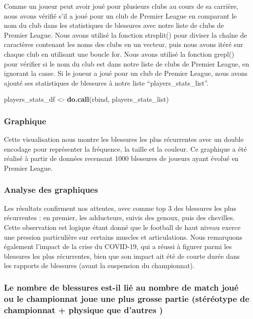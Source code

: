 \documentclass[
]{article}
\newenvironment{Shaded}{\begin{snugshade}}{\end{snugshade}}
\newcommand{\FunctionTok}[1]{\textcolor[rgb]{0.13,0.29,0.53}{\textbf{#1}}}
\newcommand{\NormalTok}[1]{#1}
\newcommand{\OtherTok}[1]{\textcolor[rgb]{0.56,0.35,0.01}{#1}}
\begin{document}
Comme un joueur peut avoir joué pour plusieurs clubs au cours de sa
carrière, nous avons vérifié s'il a joué pour un club de Premier League
en comparant le nom du club dans les statistiques de blessures avec
notre liste de clubs de Premier League. Nous avons utilisé la fonction
strsplit() pour diviser la chaîne de caractères contenant les noms des
clubs en un vecteur, puis nous avons itéré sur chaque club en utilisant
une boucle for. Nous avons utilisé la fonction grepl() pour vérifier si
le nom du club est dans notre liste de clubs de Premier League, en
ignorant la casse. Si le joueur a joué pour un club de Premier League,
nous avons ajouté ses statistiques de blessures à notre liste
``players\_stats\_list''.

\begin{Shaded}
\begin{Highlighting}[]
\NormalTok{players\_stats\_df }\OtherTok{\textless{}{-}} \FunctionTok{do.call}\NormalTok{(rbind, players\_stats\_list)}
\end{Highlighting}
\end{Shaded}

\subsubsection{Graphique}\label{graphique-1}

Cette visualisation nous montre les blessures les plus récurrentes avec
un double encodage pour représenter la fréquence, la taille et la
couleur. Ce graphique a été réalisé à partir de données recensant 1000
blessures de joueurs ayant évolué en Premier League.

\subsubsection{Analyse des graphiques}\label{analyse-des-graphiques}

Les résultats confirment nos attentes, avec comme top 3 des blessures
les plus récurrentes : en premier, les adducteurs, suivis des genoux,
puis des chevilles. Cette observation est logique étant donné que le
football de haut niveau exerce une pression particulière sur certains
muscles et articulations. Nous remarquons également l'impact de la crise
du COVID-19, qui a réussi à figurer parmi les blessures les plus
récurrentes, bien que son impact ait été de courte durée dans les
rapports de blessures (avant la suspension du championnat).

\subsubsection{\texorpdfstring{\textbf{Le nombre de blessures est-il lié
au nombre de match joué ou le championnat joue une plus grosse partie
(stéréotype de championnat + physique que d'autres
)}}{Le nombre de blessures est-il lié au nombre de match joué ou le championnat joue une plus grosse partie (stéréotype de championnat + physique que d'autres )}}\label{le-nombre-de-blessures-est-il-liuxe9-au-nombre-de-match-jouuxe9-ou-le-championnat-joue-une-plus-grosse-partie-stuxe9ruxe9otype-de-championnat-physique-que-dautres}
\end{document}
